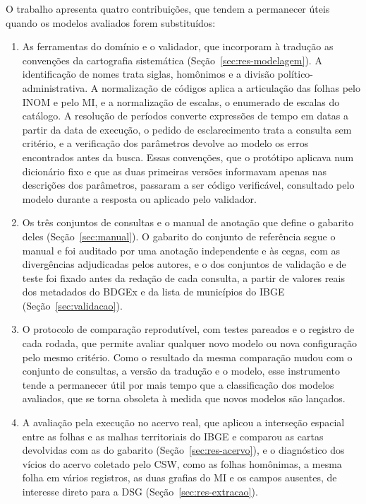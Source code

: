 O trabalho apresenta quatro contribuições, que tendem a permanecer úteis quando os modelos avaliados forem substituídos:
\begin{enumerate}
  \item As ferramentas do domínio e o validador, que incorporam à tradução as convenções da cartografia sistemática (Seção~\ref{sec:res-modelagem}). A identificação de nomes trata siglas, homônimos e a divisão político-administrativa. A normalização de códigos aplica a articulação das folhas pelo INOM e pelo MI, e a normalização de escalas, o enumerado de escalas do catálogo. A resolução de períodos converte expressões de tempo em datas a partir da data de execução, o pedido de esclarecimento trata a consulta sem critério, e a verificação dos parâmetros devolve ao modelo os erros encontrados antes da busca. Essas convenções, que o protótipo aplicava num dicionário fixo e que as duas primeiras versões informavam apenas nas descrições dos parâmetros, passaram a ser código verificável, consultado pelo modelo durante a resposta ou aplicado pelo validador.
  \item Os três conjuntos de consultas e o manual de anotação que define o gabarito deles (Seção~\ref{sec:manual}). O gabarito do conjunto de referência segue o manual e foi auditado por uma anotação independente e às cegas, com as divergências adjudicadas pelos autores, e o dos conjuntos de validação e de teste foi fixado antes da redação de cada consulta, a partir de valores reais dos metadados do BDGEx e da lista de municípios do IBGE (Seção~\ref{sec:validacao}).
  \item O protocolo de comparação reprodutível, com testes pareados e o registro de cada rodada, que permite avaliar qualquer novo modelo ou nova configuração pelo mesmo critério. Como o resultado da mesma comparação mudou com o conjunto de consultas, a versão da tradução e o modelo, esse instrumento tende a permanecer útil por mais tempo que a classificação dos modelos avaliados, que se torna obsoleta à medida que novos modelos são lançados.
  \item A avaliação pela execução no acervo real, que aplicou a interseção espacial entre as folhas e as malhas territoriais do IBGE e comparou as cartas devolvidas com as do gabarito (Seção~\ref{sec:res-acervo}), e o diagnóstico dos vícios do acervo coletado pelo CSW, como as folhas homônimas, a mesma folha em vários registros, as duas grafias do MI e os campos ausentes, de interesse direto para a DSG (Seção~\ref{sec:res-extracao}).
\end{enumerate}

